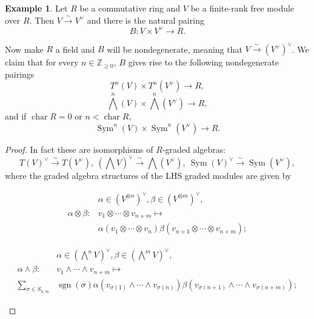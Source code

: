 \documentclass[17pt]{extarticle}
\theoremstyle{definition}\newtheorem{example}{Example}[]
\theoremstyle{definition}\newtheorem{corollary}[example]{Corollary}
\theoremstyle{definition}\newtheorem{definition}[example]{Definition}
\theoremstyle{definition}\newtheorem{lemma}[example]{Lemma}
\theoremstyle{definition}\newtheorem{theorem}[example]{Theorem}
\theoremstyle{definition}\newtheorem{proposition}[example]{Proposition}
\theoremstyle{definition}\newtheorem{remark}[example]{Remark}
\begin{document}
\begin{example}
    Let $R$ be a commutative ring and $V$ be a finite-rank free module over $R$. Then $V\xrightarrow{\sim}V^\vee$ and there is the natural pairing
    $$B:V\times V^\vee\longrightarrow R.$$

    Now make $R$ a field and $B$ will be nondegenerate, meaning that $V\xrightarrow{\sim}(V^\vee)^\vee$. We claim that for every $n\in\mathbb{Z}_{\geq 0}$, $B$ gives rise to the following nondegenerate pairings
    $$T^n(V)\times T^n(V^\vee)\longrightarrow R,$$
    $$\bigwedge^n(V)\times \bigwedge^n(V^\vee)\longrightarrow R,$$
    and if $\operatorname{char}R=0$ or $n<\operatorname{char}R$,
    $$\operatorname{Sym}^n(V)\times \operatorname{Sym}^n(V^\vee)\longrightarrow R.$$
\end{example}

\begin{proof}
    In fact these are isomorphisms of $R$-graded algebras:
    $$T(V)^\vee\xrightarrow{\sim}T(V^\vee),\ 
    (\bigwedge V)^\vee\xrightarrow{\sim}\bigwedge(V^\vee),\
    \operatorname{Sym}(V)^\vee\xrightarrow{\sim}\operatorname{Sym}(V^\vee),$$
    where the graded algebra structures of the LHS graded modules are given by 
    \begin{flushleft}
    \begin{align*}
        &\alpha\in (V^{\otimes n})^\vee,\beta\in (V^{\otimes m})^\vee,\\
        \alpha\otimes\beta:&v_1\otimes\cdots\otimes v_{n+m}\mapsto\\
        &\alpha(v_1\otimes\cdots\otimes v_n)\beta(v_{n+1}\otimes\cdots\otimes v_{n+m});
    \end{align*}
    \end{flushleft}

    \begin{flushleft}
    \begin{align*}
        &\alpha\in (\bigwedge^nV)^\vee,\beta\in (\bigwedge^mV)^\vee,\\
        \alpha\wedge\beta:&v_1\wedge\cdots\wedge v_{n+m}\mapsto\\
        \sum_{\sigma\in S_{n,m}}&\operatorname{sgn}(\sigma)\alpha(v_{\sigma(1)}\wedge\cdots\wedge v_{\sigma(n)})\beta(v_{\sigma(n+1)}\wedge\cdots\wedge v_{\sigma(n+m)});
    \end{align*}
    \end{flushleft}


\end{proof}
\end{document}
